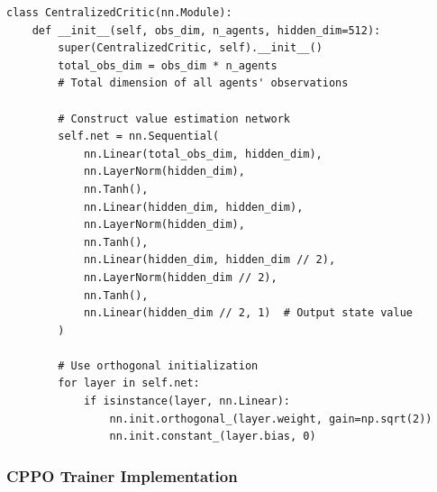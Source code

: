 \documentclass[12pt]{article}
\begin{document}
\begin{verbatim}
class CentralizedCritic(nn.Module):
    def __init__(self, obs_dim, n_agents, hidden_dim=512):
        super(CentralizedCritic, self).__init__()
        total_obs_dim = obs_dim * n_agents  
        # Total dimension of all agents' observations
        
        # Construct value estimation network
        self.net = nn.Sequential(
            nn.Linear(total_obs_dim, hidden_dim),
            nn.LayerNorm(hidden_dim),
            nn.Tanh(),
            nn.Linear(hidden_dim, hidden_dim),
            nn.LayerNorm(hidden_dim),
            nn.Tanh(),
            nn.Linear(hidden_dim, hidden_dim // 2),
            nn.LayerNorm(hidden_dim // 2),
            nn.Tanh(),
            nn.Linear(hidden_dim // 2, 1)  # Output state value
        )
        
        # Use orthogonal initialization
        for layer in self.net:
            if isinstance(layer, nn.Linear):
                nn.init.orthogonal_(layer.weight, gain=np.sqrt(2))
                nn.init.constant_(layer.bias, 0)
\end{verbatim}

\subsubsection{CPPO Trainer Implementation}
\end{document}
